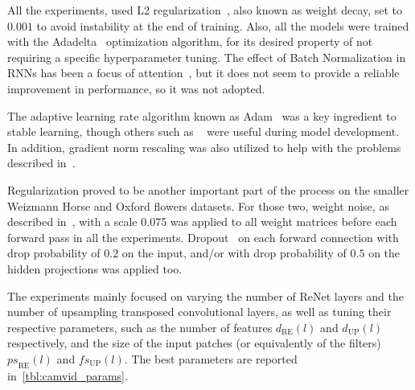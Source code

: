 All the experiments, used L2 regularization~\cite{Krogh92asimple}, also known
as weight decay, set to $0.001$ to avoid instability at the end of training.
Also, all the models were trained with the Adadelta~\cite{Zeiler-2012}
optimization algorithm, for its desired property of not requiring a specific
hyperparameter tuning. The effect of Batch Normalization in RNNs has been a
focus of attention~\cite{Laurent2015}, but it does not seem to provide a
reliable improvement in performance, so it was not adopted.

The adaptive learning rate algorithm known as Adam~\cite{Kingma2014} was a
key ingredient to stable learning, though others such as ~\cite{Zeiler-2012}
were useful during model development. In addition, gradient norm rescaling was
also utilized to help with the problems described in~\cite{bengio2013advances}.

Regularization proved to be another important part of the process on the
smaller Weizmann Horse and Oxford flowers datasets. For those two, weight
noise, as described in~\cite{Graves2011}, with a scale 0.075 was applied to all
weight matrices before each forward pass in all the experiments.
Dropout~\cite{Srivastava14} on each forward connection with drop probability of
$0.2$ on the input, and/or with drop probability of $0.5$ on the hidden
projections was applied too.

The experiments mainly focused on varying the number of ReNet layers and the
number of upsampling transposed convolutional layers, as well as tuning their
respective parameters, such as the number of features $d_{\text{RE}}(l)$ and
$d_{\text{UP}}(l)$ respectively, and the size of the input patches (or
equivalently of the filters) ${ps}_{\text{RE}}(l)$ and ${fs}_{\text{UP}}(l)$.
The best parameters are reported in~\autoref{tbl:camvid_params}.

%


